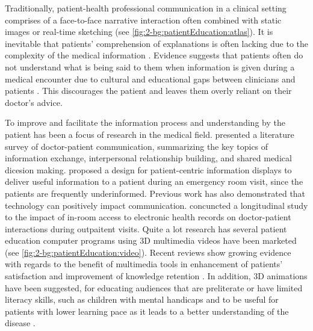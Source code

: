 Traditionally, patient-health professional communication in a clinical setting comprises of a face-to-face narrative interaction often combined with static images or real-time sketching (see \figurename{\ref{fig:2-bg:patientEducation:atlas}}). 
It is inevitable that patients' comprehension of explanations is often lacking due to the complexity of the medical information \cite{Cleeren2014}. Evidence suggests that patients often do not understand what is being said to them when information is given during a medical encounter due to cultural and educational gaps between clinicians and patients \cite{Beranova2007}. This discourages the patient and leaves them overly reliant on their doctor's advice.

To improve and facilitate the information process and understanding by the patient has been a focus of research in the medical field. 
\citet{Ong1995} presented a literature survey of doctor-patient communication, summarizing the key topics of information exchange, interpersonal relationship building, and shared medical dicesion making. \citet{Wilcox2010a} proposed a design for patient-centric information displays to deliver useful information to a patient during an emergency room visit, since the patients are frequently underinformed. Previous work has also demonstrated that technology can positively impact communication. \citet{Hsu2005} concuncted a longitudinal study to the impact of in-room access to electronic health records on doctor-patient interactions during outpaitent visits.
Quite a lot research has several patient education computer programs using 3D multimedia videos have been marketed (see \figurename{\ref{fig:2-bg:patientEducation:video}}). 
Recent reviews show growing evidence with regards to the benefit of multimedia tools in enhancement of patients' satisfaction and improvement of knowledge retention \cite{Beranova2007}. In addition, 3D animations have been suggested, for educating audiences that are preliterate or have limited literacy skills, such as children with mental handicaps \cite{T.1997} and to be useful for patients with lower learning pace as it leads to a better understanding of the disease \cite{Jimison1998}. 
